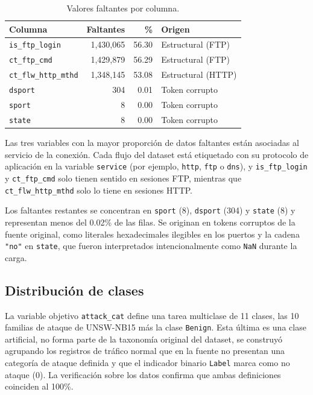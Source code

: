 \documentclass[conference]{IEEEtran}
\begin{document}
    \begin{table}[h!]
    \centering
    \caption{Valores faltantes por columna.}
    \label{tab:faltantes}
    \begin{tabular}{lrrl}
    \hline
    \textbf{Columna} & \textbf{Faltantes} & \textbf{\%} & \textbf{Origen} \\
    \hline
    \texttt{is\_ftp\_login} & 1,430,065 & 56.30 & Estructural (FTP) \\
    \texttt{ct\_ftp\_cmd}    & 1,429,879 & 56.29 & Estructural (FTP) \\
    \texttt{ct\_flw\_http\_mthd} & 1,348,145 & 53.08 & Estructural (HTTP) \\
    \texttt{dsport}          & 304       & 0.01  & Token corrupto \\
    \texttt{sport}           & 8         & 0.00  & Token corrupto \\
    \texttt{state}           & 8         & 0.00  & Token corrupto \\
    \hline
    \end{tabular}
    \end{table}

    Las tres variables con la mayor proporción de datos faltantes están asociadas al servicio de la conexión. Cada flujo del dataset está etiquetado con su protocolo de aplicación en la variable \texttt{service} (por ejemplo, \texttt{http}, \texttt{ftp} o \texttt{dns}), y \texttt{is\_ftp\_login} y \texttt{ct\_ftp\_cmd} solo tienen sentido en sesiones FTP, mientras que \texttt{ct\_flw\_http\_mthd} solo lo tiene en sesiones HTTP. 

    Los faltantes restantes se concentran en \texttt{sport} (8), \texttt{dsport} (304) y \texttt{state} (8) y representan menos del 0.02\% de las filas. Se originan en tokens corruptos de la fuente original, como literales hexadecimales ilegibles en los puertos y la cadena \texttt{"no"} en \texttt{state}, que fueron interpretados intencionalmente como \texttt{NaN} durante la carga. 

    \subsection{Distribución de clases}

    \FloatBarrier

    La variable objetivo \texttt{attack\_cat} define una tarea multiclase de
    11 clases, las 10 familias de ataque de UNSW-NB15 más la clase
    \texttt{Benign}. Esta última es una clase artificial, no forma parte de
    la taxonomía original del dataset, se construyó agrupando los registros de
    tráfico normal que en la fuente no presentan una categoría de ataque
    definida y que el indicador binario \texttt{Label} marca como no ataque
    (0). La verificación sobre los datos confirma que ambas definiciones
    coinciden al 100\%.
\end{document}
